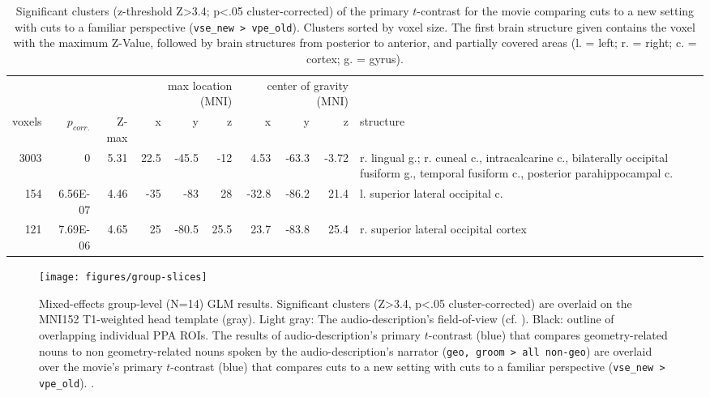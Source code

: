 \documentclass[english]{article}
\begin{document}
\begin{table}[t]
    \caption{Significant clusters (z-threshold Z>3.4; p<.05 cluster-corrected)
        of the primary $t$-contrast for the movie comparing cuts to a new
        setting with cuts to a familiar perspective (\texttt{vse\_new >
        vpe\_old}).
Clusters sorted by voxel size.
The first brain structure given contains the voxel with the maximum Z-Value,
followed by brain structures from posterior to anterior, and partially covered
areas (l. = left; r. = right; c. = cortex; g. = gyrus).}
\label{tab:res-av-group1}
\begin{tabular}{rrrrrrrrrp{3cm}}
\toprule
& & & \multicolumn{3}{r}{max location (MNI)} & \multicolumn{3}{r}{center of gravity (MNI)} &
\\ \cmidrule{4-6} \cmidrule{7-9}
voxels & $p_{corr.}$ & Z-max & x & y & z  & x & y & z & structure \\
\midrule
3003 & 0 & 5.31 & 22.5 & -45.5 & -12 & 4.53 & -63.3 & -3.72 & r. lingual g.; r. cuneal c., intracalcarine c., bilaterally occipital fusiform g., temporal fusiform c., posterior parahippocampal c.  \\
154 & 6.56E-07 & 4.46 & -35 & -83 & 28 & -32.8 & -86.2 & 21.4 & l. superior lateral occipital c. \\
121 & 7.69E-06 & 4.65 & 25 & -80.5 & 25.5 & 23.7 & -83.8 & 25.4 & r. superior lateral occipital cortex \\
\bottomrule
\end{tabular}
\end{table}


\begin{figure} \centering
    \texttt{[image: figures/group-slices]}
    \caption{Mixed-effects group-level (N=14) GLM results. Significant clusters
        (Z>3.4, p<.05 cluster-corrected) are overlaid on the MNI152 T1-weighted
        head template (gray).
        Light gray: The audio-description's field-of-view
        (cf. \citep{hanke2014audiomovie}).
        Black: outline of overlapping individual PPA ROIs.
        The results of audio-description's primary $t$-contrast (blue) that
        compares geometry-related nouns to non geometry-related nouns spoken by
        the audio-description's narrator (\texttt{geo, groom > all non-geo})
        are overlaid over the movie's primary $t$-contrast (blue) that compares
        cuts to a new setting with cuts to a familiar perspective
        (\texttt{vse\_new > vpe\_old}).
   \citep{sengupta2016extension}.}
    \label{fig:group-slices}
\end{figure}
\end{document}
